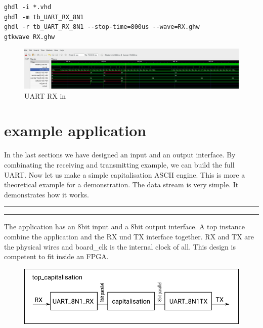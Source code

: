 \documentclass[a4paper,11pt]{article}
\begin{document}
\begin{verbatim}
ghdl -i *.vhd
ghdl -m tb_UART_RX_8N1
ghdl -r tb_UART_RX_8N1 --stop-time=800us --wave=RX.ghw
gtkwave RX.ghw
\end{verbatim}

\begin{figure}[H]
  \begin{center}
    \includegraphics[scale=0.3]{rx/sim_RX.png}
    \caption{UART RX in}
    \label{fig:sim RX}
  \end{center}
\end{figure}

\section{example application}
In the last sections we have designed an input and an output interface. By combinating the receiving and transmitting example, we can build the full UART. Now let us make a simple capitalisation ASCII engine. This is more a theoretical example for a demonstration. The data stream is very simple. It demonstrates how it works.
\\
\hrule

\hrule
\vspace{10pt}

The application has an 8bit input and a 8bit output interface. A top instance combine the application and the RX und TX interface together. RX and TX are the physical wires and board\_clk is the internal clock of all. This design is competent to fit inside an FPGA. 
\begin{figure}[H]
  \begin{center}
    \includegraphics[scale=0.4]{capitalisation/zeichnung.png}
  \end{center}
\end{figure}
\end{document}
